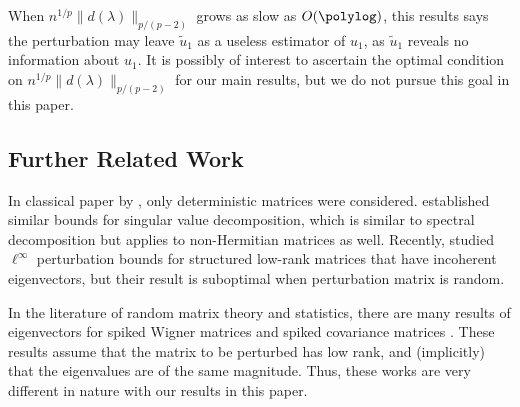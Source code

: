 \documentclass[12pt]{article}%
\theoremstyle{plain}%
\theoremstyle{remark}
\begin{document}
When $n^{1/p} \| d(\lambda) \|_{p/(p-2)}$ grows as slow as $O(\polylog)$, this results says the perturbation may leave $\tilde{u}_1$ as a useless estimator of $u_1$, as $\tilde{u}_1$ reveals no information about $u_1$. It is possibly of interest to ascertain the optimal condition on $n^{1/p} \| d(\lambda) \|_{p/(p-2)}$ for our main results, but we do not pursue this goal in this paper.


\subsection{Further Related Work}\label{sec::related}

In classical paper by \cite{DavKah70}, only deterministic matrices were considered. \cite{Wed72} established similar bounds for singular value decomposition, which is similar to spectral decomposition but applies to non-Hermitian matrices as well. Recently, \cite{FanWanZho16} studied $\ell^\infty$ perturbation bounds for structured low-rank matrices that have incoherent eigenvectors, but their result is suboptimal when perturbation matrix is random.

In the literature of random matrix theory and statistics, there are many results of eigenvectors for spiked Wigner matrices \citep{Ben11} and spiked covariance matrices \citep{Pau07, JohLu12, BenNad12}. These results assume that the matrix to be perturbed has low rank, and (implicitly) that the eigenvalues are of the same magnitude. Thus, these works are very different in nature with our results in this paper. 


\end{document}
